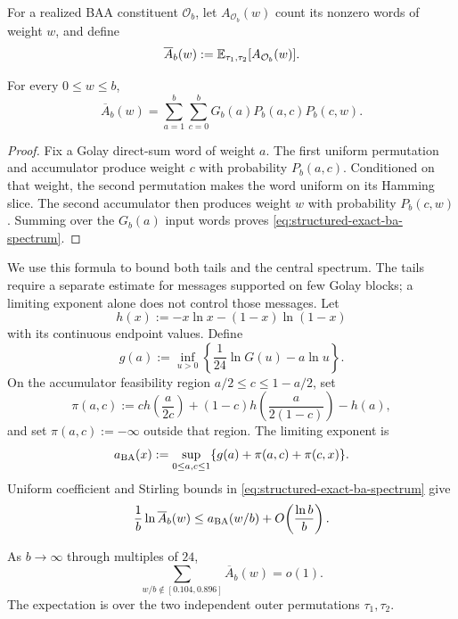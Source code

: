 For a realized BAA constituent $\mathcal O_b$, let
$A_{\mathcal O_b}(w)$ count its nonzero words of weight $w$, and define
\[
  \overline A_b(w)
  :=
  \mathbb E_{\tau_1,\tau_2}[A_{\mathcal O_b}(w)].
\]

\begin{lemma}
\label{lem:structured-exact-ba-spectrum}
For every $0\le w\le b$,
\begin{equation}
  \overline A_b(w)
  =
  \sum_{a=1}^b\sum_{c=0}^b
  G_b(a)P_b(a,c)P_b(c,w).
  \label{eq:structured-exact-ba-spectrum}
\end{equation}
\end{lemma}

\begin{proof}
Fix a Golay direct-sum word of weight $a$. The first uniform permutation and
accumulator produce weight $c$ with probability $P_b(a,c)$. Conditioned on
that weight, the second permutation makes the word uniform on its Hamming
slice. The second accumulator then produces weight $w$ with probability
$P_b(c,w)$. Summing over the $G_b(a)$ input words proves
\eqref{eq:structured-exact-ba-spectrum}.
\end{proof}

We use this formula to bound both tails and the central spectrum.
The tails require a separate estimate for messages supported on few Golay
blocks; a limiting exponent alone does not control those messages. Let
\[
  h(x):=-x\ln x-(1-x)\ln(1-x)
\]
with its continuous endpoint values. Define
\[
  g(a)
  :=
  \inf_{u>0}\left\{\frac1{24}\ln G(u)-a\ln u\right\}.
\]
On the accumulator feasibility region $a/2\le c\le1-a/2$, set
\[
  \pi(a,c)
  :=
  c h\!\left(\frac{a}{2c}\right)
  +(1-c)h\!\left(\frac{a}{2(1-c)}\right)-h(a),
\]
and set $\pi(a,c):=-\infty$ outside that region. The limiting exponent is
\begin{equation}
  a_{\rm BA}(x)
  :=
  \sup_{0\le a,c\le1}
  \{g(a)+\pi(a,c)+\pi(c,x)\}.
  \label{eq:structured-ba-variational}
\end{equation}
Uniform coefficient and Stirling bounds in
\eqref{eq:structured-exact-ba-spectrum} give
\begin{equation}
  \frac1b\ln\overline A_b(w)
  \le
  a_{\rm BA}(w/b)
  +O\!\left(\frac{\ln b}{b}\right).
  \label{eq:structured-ba-asymptotic}
\end{equation}

\begin{lemma}
\label{lem:structured-ba-tails}
As $b\to\infty$ through multiples of $24$,
\[
  \sum_{w/b\notin[0.104,0.896]}\overline A_b(w)=o(1).
\]
The expectation is over the two independent outer permutations $\tau_1,\tau_2$.
\end{lemma}

